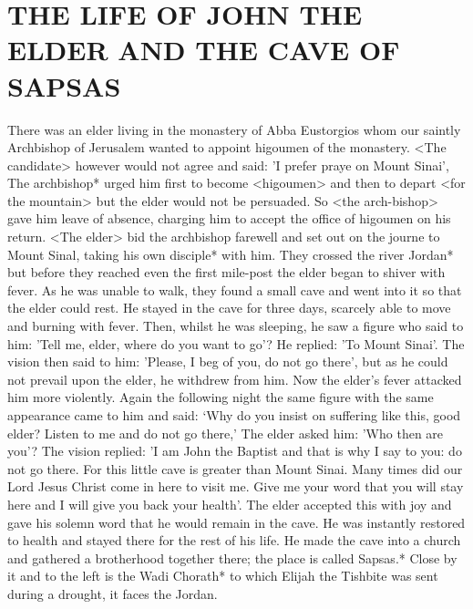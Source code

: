 \chapter{
THE LIFE OF JOHN THE ELDER AND THE CAVE OF SAPSAS
}

There was an elder living in the monastery of Abba Eustorgios whom our saintly Archbishop of Jerusalem wanted to appoint higoumen of the monastery.
<The candidate> however would not agree and said: 'I prefer praye on Mount Sinai', The archbishop* urged him first to become <higoumen> and then to depart <for the mountain> but the elder would not be persuaded.
So <the arch-bishop> gave him leave of absence, charging him to accept the office of higoumen on his return.
<The elder> bid the archbishop farewell and set out on the journe to Mount Sinal, taking his own disciple* with him.
They crossed the river Jordan* but before they reached even the first mile-post the elder began to shiver with fever.
As he was unable to walk, they found a small cave and went into it so that the elder could rest.
He stayed in the cave for three days, scarcely able to move and burning with fever.
Then, whilst he was sleeping, he saw a figure who said to him: 'Tell me, elder, where do you want to go'?
He replied: 'To Mount Sinai'.
The vision then said to him: 'Please, I beg of you, do not go there', but as he could not prevail upon the elder, he withdrew from him.
Now the elder's fever attacked him more violently.
Again the following night the same figure with the same appearance came to him and said: `Why do you insist on suffering like this, good elder?
Listen to me and do not go there,' The elder asked him: 'Who then are you'?
The vision replied: 'I am John the Baptist and that is why I say to you: do not go there.
For this little cave is greater than Mount Sinai.
Many times did our Lord Jesus Christ come in here to visit me.
Give me your word that you will stay here and I will give you back your health'.
The elder accepted this with joy and gave his solemn word that he would remain in the cave.
He was instantly restored to health and stayed there for the rest of his life.
He made the cave into a church and gathered a brotherhood together there;
the place is called Sapsas.*
Close by it and to the left is the Wadi Chorath* to which Elijah the Tishbite was sent during a drought, it faces the Jordan.

